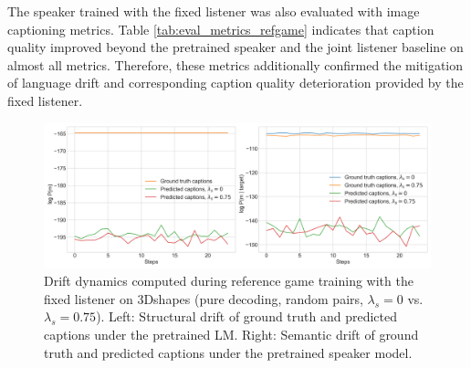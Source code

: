 The speaker trained with the fixed listener was also evaluated with image captioning metrics. Table \ref{tab:eval_metrics_refgame} indicates that caption quality improved beyond the pretrained speaker and the joint listener baseline on almost all metrics. Therefore, these metrics additionally confirmed the mitigation of language drift and corresponding caption quality deterioration provided by the fixed listener.

\begin{figure}[h]
	\centering
	\includegraphics[width=\linewidth]{images/3dshapes_fixedListener_structural_semantic_drift_49_pure_0_075_random.png}
	\caption{Drift dynamics computed during reference game training with the fixed listener on 3Dshapes (pure decoding, random pairs, $\lambda_s=0$ vs. $\lambda_s=0.75$). Left: Structural drift of ground truth and predicted captions under the pretrained LM. Right: Semantic drift of ground truth and predicted captions under the pretrained speaker model.}
	\label{fig:3dshapes_fixed_listener_0_075_str_sem_drift}
\end{figure}

